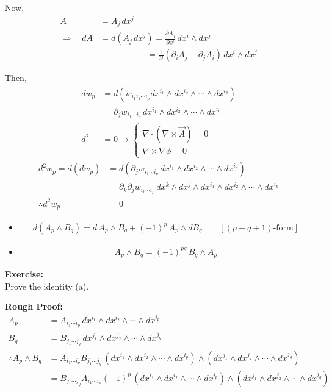 \documentclass[14pt]{article} %
\begin{document}
Now,
\begin{align*}
A &= A_j\,dx^j 
\\
\Rightarrow\quad
dA &= d(A_j \,dx^j)
= \frac{\partial A_j}{\partial x^i}\,
dx^i \wedge dx^j
\\
&\qquad\qquad\quad~\;=\frac{1}{2!}(\partial_i A_j - \partial_j A_i) \, dx^i \wedge dx^j
\end{align*}

Then,
\begin{align*}
d w_p &= d( w_{i_1 i_2\cdots i_p} dx^{i_1} \wedge dx^{i_2}\wedge \cdots\wedge dx^{i_p} )
\\
&= \partial_jw_{i_1\cdots i_p}\, dx^{i_1} \wedge dx^{i_2} \wedge \cdots \wedge dx^{i_p}
\\
d^2 &= 0 \longrightarrow
\begin{cases}
    \nabla \cdot (\nabla \times \vec{A}) = 0 \\
    \nabla \times \nabla \phi = 0
\end{cases}
\end{align*}
\begin{align*}
d^2 w_p = d (dw_p) &= d(\partial_jw_{i_1\cdots i_p}\,dx^{i_1} \wedge dx^{i_2} \wedge \cdots \wedge dx^{i_p})
\\
&= \partial_k \partial_jw_{i_1\cdots i_p}\, dx^{k} \wedge dx^{j} \wedge dx^{i_1} \wedge dx^{i_2} \wedge \cdots \wedge dx^{i_p}
\\
\therefore d^2 w_p &= 0
\end{align*}
\begin{itemize}
\item[a)]
\begin{align*}
d( A_p \wedge B_q ) = d\, A_p \wedge B_q + (-1)^p \,A_p \wedge dB_q \qquad [ (p+q+1)\text{-form} ]
\end{align*}

\item[b)] 
\begin{align*}
A_p \wedge B_q = (-1)^{pq}\, B_q \wedge A_p
\end{align*}
\end{itemize}
\begin{tcolorbox}
\textbf{Exercise:}\\
\noindent Prove the identity (a).
\end{tcolorbox}

\begin{tcolorbox}
\textbf{Rough Proof:}
\begin{align*}
A_p &= A_{i_1 \cdots i_p} \,dx^{i_1}\wedge dx^{i_2} \wedge \cdots \wedge dx^{i_p}  
\\
B_q &= B_{j_1 \cdots j_q} \,dx^{j_1}\wedge dx^{j_2} \wedge \cdots \wedge dx^{j_q}  
\\
\therefore A_p \wedge B_q &= A_{i_1 \cdots i_p} B_{j_1 \cdots j_q} \, (dx^{i_1}\wedge dx^{i_2} \wedge \cdots \wedge dx^{i_p}  ) \wedge (dx^{j_1}\wedge dx^{j_2} \wedge \cdots \wedge dx^{j_q}  ) \\
&= B_{j_1 \cdots j_q} A_{i_1 \cdots i_p} (-1)^p \,(dx^{i_1}\wedge dx^{i_2} \wedge \cdots \wedge dx^{i_p}  ) \wedge (dx^{j_1}\wedge dx^{j_2} \wedge \cdots \wedge dx^{j_q}  )
\end{align*}
\end{tcolorbox}
\end{document}
